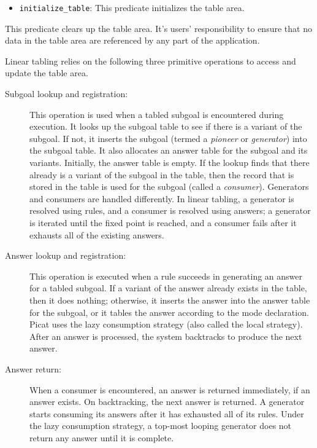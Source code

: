 \begin{itemize}
\item \texttt{initialize\_table}: This predicate initializes the table area.   
\end{itemize}
This predicate clears up the table area. It's users' responsibility to ensure that no data in the table area are referenced by any part of the application.

Linear tabling relies on the following three primitive operations to access and update the table area.

\begin{description}
\item[Subgoal lookup and registration:] This operation is used when a tabled subgoal is encountered during execution. It looks up the subgoal table to see if there is a variant of the subgoal. If not, it inserts the subgoal (termed a \emph{pioneer} or \emph{generator}) into the subgoal table. It also allocates an answer table for the subgoal and its variants. Initially, the answer table is empty. If the lookup finds that there already is a variant of the subgoal in the table, then the record that is stored in the table is used for the subgoal (called a \emph{consumer}). Generators and consumers are handled differently. In linear tabling, a generator is resolved using rules, and a consumer is resolved using answers; a generator is iterated until the fixed point is reached, and a consumer fails after it exhausts all of the existing answers.
\item[Answer lookup and registration:] This operation is executed when a rule succeeds in generating an answer for a tabled subgoal. If a variant of the answer already exists in the table, then it does nothing; otherwise, it inserts the answer into the answer table for the subgoal, or it tables the answer according to the mode declaration. Picat uses the lazy consumption strategy (also called the local strategy). After an answer is processed, the system backtracks to produce the next answer. 
\item[Answer return:] When a consumer is encountered, an answer is returned immediately, if an answer exists. On backtracking, the next answer is returned. A generator starts consuming its answers after it has exhausted all of its rules. Under the lazy consumption strategy, a top-most looping generator does not return any answer until it is complete.
\end{description}


